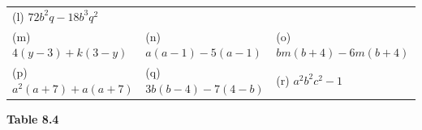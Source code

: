 \begin{enumerate}[noitemsep, label=\textbf{\arabic*}. ]
{{\begin{center}
\begin{xtabular}[t]{|l|l|l|}
        (l) $72{b}^{2}q-18{b}^{3}{q}^{2}$%
     \tabularnewline{}
        (m) $4\left(y-3\right)+k\left(3-y\right)$ &
        (n) $a\left(a-1\right)-5\left(a-1\right)$ &
        (o) $bm\left(b+4\right)-6m\left(b+4\right)$%
     \tabularnewline{}
        (p) ${a}^{2}\left(a+7\right)+a\left(a+7\right)$ &
        (q) $3b\left(b-4\right)-7\left(4-b\right)$ &
        (r) ${a}^{2}{b}^{2}{c}^{2}-1$%
     \tabularnewline{}
    \end{xtabular}
      \end{center}
    \begin{center}{\small\bfseries Table 8.4}\end{center}
          } %
        }{%
        }
\end{enumerate}
